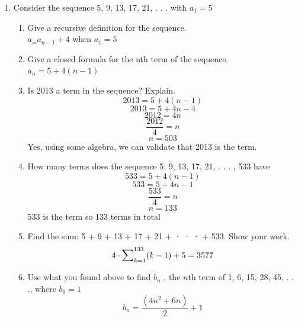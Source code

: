 \documentclass[11pt,a4paper]{article}
\begin{document}
        \begin{enumerate}

            \item Consider the sequence 5, 9, 13, 17, 21, . . . with $a_1 = 5$
                \begin{enumerate}

                \item Give a recursive definition for the sequence.\\
                $a_ = a_{n-1} + 4$ when $a_1 = 5$
                \item Give a closed formula for the nth term of the sequence.\\
                $a_n = 5 + 4(n-1)$
                \item Is 2013 a term in the sequence? Explain.\\
                $$2013 = 5 + 4(n - 1)$$
                $$2013 = 5 + 4n - 4$$
                $$2012 = 4n$$
                $$\frac{2012}{4} = n$$
                $$n = 503$$
                Yes, using some algebra, we can validate that 2013 is the  term.\\
                \item How many terms does the sequence 5, 9, 13, 17, 21, . . . , 533 have\\
                    $$533 = 5 + 4(n - 1)$$
                    $$533 = 5 + 4n - 1$$
                    $$\frac{533}{4} = n$$
                    $$n = 133$$
                    533 is the  term so 133 terms in total
                \item Find the sum: 5 + 9 + 13 + 17 + 21 + · · · + 533. Show your work.\\
                    $$4\cdot{\mathlarger{\sum}}_{k=1}^{133}(k - 1) + 5 = 3577$$
                \item Use what you found above to find $b_n$ , the $n$th term of 1, 6, 15, 28, 45, . . ., where $b_0 = 1$
                    $$b_n = \frac{(4n^2 + 6n)}{2} + 1$$
                \end{enumerate}



\end{enumerate}
\end{document}
